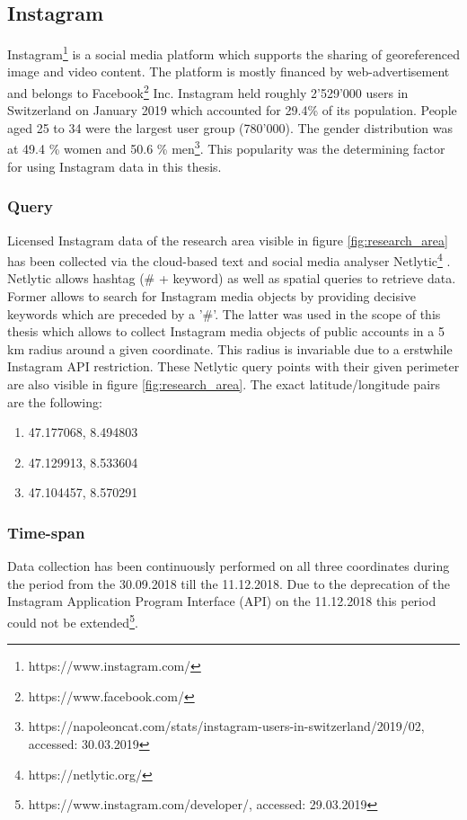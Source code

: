 \subsection{Instagram} \label{instagram}
Instagram\footnote{https://www.instagram.com/} is a social media platform which supports the sharing of georeferenced image and video content. The platform is mostly financed by web-advertisement and belongs to Facebook\footnote{https://www.facebook.com/} Inc. Instagram held roughly 2'529'000 users in Switzerland on January 2019 which accounted for 29.4\% of its population. People aged 25 to 34 were the largest user group (780'000). The gender distribution was at 49.4 \% women and 50.6 \% men\footnote{https://napoleoncat.com/stats/instagram-users-in-switzerland/2019/02, accessed: 30.03.2019}. This popularity was the determining factor for using Instagram data in this thesis.\\

\subsubsection{Query} \label{netlytic}
Licensed Instagram data of the research area visible in figure \ref{fig:research_area} has been collected via the cloud-based text and social media analyser Netlytic\footnote{https://netlytic.org/} \parencite{Gruzd2016}. Netlytic allows hashtag (\# + keyword) as well as spatial queries to retrieve data. Former allows to search for Instagram media objects by providing decisive keywords which are preceded by a '\#'. The latter was used in the scope of this thesis which allows to collect Instagram media objects of public accounts in a 5 km radius around a given coordinate. This radius is invariable due to a erstwhile Instagram API restriction. These Netlytic query points with their given perimeter are also visible in figure \ref{fig:research_area}. The exact latitude/longitude pairs are the following:\\
\begin{enumerate}
  \item 47.177068, 8.494803
  \item 47.129913, 8.533604
  \item 47.104457, 8.570291
\end{enumerate}

\subsubsection{Time-span} \label{Instagram_timespan}
Data collection has been continuously performed on all three coordinates during the period from the 30.09.2018 till the 11.12.2018. Due to the deprecation of the Instagram Application Program Interface (API) on the 11.12.2018 this period could not be extended\footnote{https://www.instagram.com/developer/, accessed: 29.03.2019}.

